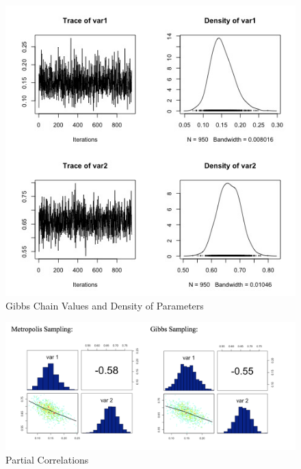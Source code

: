 \documentclass[11pt,a4paper]{article}
\begin{document}
\begin{figure}[h!]
  \includegraphics[scale=0.33]{images/gibbs_5000_100.jpg}
  \caption{Gibbs Chain Values and Density of Parameters}
\end{figure}

\begin{figure}[h!]
  \includegraphics[scale=0.8]{images/correlation.png}
  \caption{Partial Correlations}
\end{figure}
\end{document}
